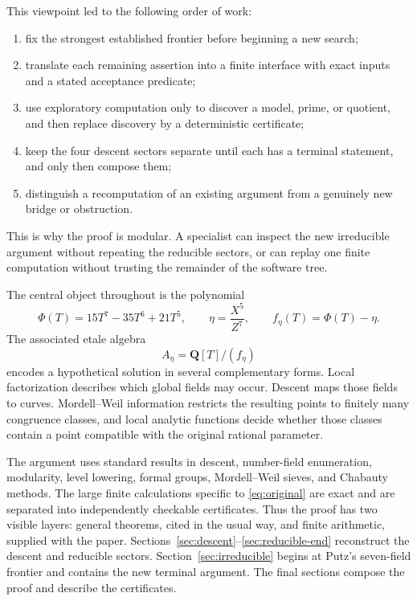 \documentclass[11pt]{article}
\newcommand{\Q}{\mathbf Q}
\theoremstyle{definition}
\theoremstyle{remark}
\begin{document}
This viewpoint led to the following order of work:
\begin{enumerate}[leftmargin=2.2em]
\item fix the strongest established frontier before beginning a new search;
\item translate each remaining assertion into a finite interface with exact
inputs and a stated acceptance predicate;
\item use exploratory computation only to discover a model, prime, or
quotient, and then replace discovery by a deterministic certificate;
\item keep the four descent sectors separate until each has a terminal
statement, and only then compose them;
\item distinguish a recomputation of an existing argument from a genuinely
new bridge or obstruction.
\end{enumerate}
This is why the proof is modular.  A specialist can inspect the new
irreducible argument without repeating the reducible sectors, or can replay
one finite computation without trusting the remainder of the software tree.

The central object throughout is the polynomial
\begin{equation}\label{eq:phi}
 \Phi(T)=15T^7-35T^6+21T^5,
 \qquad \eta=\frac{X^5}{Z^7},
 \qquad f_\eta(T)=\Phi(T)-\eta.
\end{equation}
The associated etale algebra
\[
                         A_\eta=\Q[T]/(f_\eta)
\]
encodes a hypothetical solution in several complementary forms.  Local
factorization describes which global fields may occur.  Descent maps those
fields to curves.  Mordell--Weil information restricts the resulting points
to finitely many congruence classes, and local analytic functions decide
whether those classes contain a point compatible with the original rational
parameter.

The argument uses standard results in descent, number-field
enumeration, modularity, level lowering, formal groups, Mordell--Weil sieves,
and Chabauty methods.  The large finite calculations specific to
\eqref{eq:original} are exact and are separated into independently
checkable certificates.  Thus the proof has two visible layers: general
theorems, cited in the usual way, and finite arithmetic, supplied with the
paper.  Sections~\ref{sec:descent}--\ref{sec:reducible-end} reconstruct the
descent and reducible sectors.  Section~\ref{sec:irreducible} begins at
Putz's seven-field frontier and contains the new terminal argument.  The
final sections compose the proof and describe the certificates.
\end{document}
